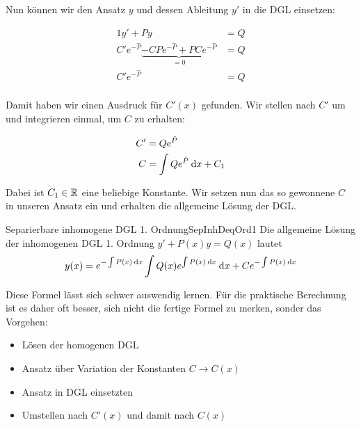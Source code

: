 Nun können wir den Ansatz $y$ und dessen Ableitung $y'$ in die DGL einsetzen:

\begin{alignat*}{1}
    y'+Py                                                 &= Q \\
    C' e^{-\hat{P}} \underbrace{- C P e^{-\hat{P}} + P C e^{-\hat{P}}}_{=0} &= Q \\
    C' e^{-\hat{P}} &= Q \\
\end{alignat*}

Damit haben wir einen Ausdruck für $C'(x)$ gefunden. Wir stellen nach $C'$ um und integrieren einmal, um $C$ zu erhalten:

\begin{alignat*}{1}
    C' &= Q e^{\hat{P}} \\
    C  &= \int Q e^{\hat{P}} \:\mathrm{d}{x} + C_1
\end{alignat*}

Dabei ist $C_1 \in \mathbb{R}$ eine beliebige Konstante. Wir setzen nun das so gewonnene $C$ in unseren Ansatz ein und erhalten die allgemeine Lösung der DGL.

\begin{statement}{Separierbare inhomogene DGL 1. Ordnung}{SepInhDeqOrd1}
    Die allgemeine Lösung der inhomogenen DGL 1. Ordnung $y'+P(x)y=Q(x)$ lautet
    $$
        y(x) =  e^{-\int P(x) \:\mathrm{d}{x}} \int Q(x) e^{\int P(x) \:\mathrm{d}{x}} \:\mathrm{d}{x}   + C e^{-\int P(x) \:\mathrm{d}{x}}
    $$
\end{statement}

Diese Formel lässt sich schwer auswendig lernen. Für die praktische Berechnung ist es daher oft besser, sich nicht die fertige Formel zu merken, sonder das Vorgehen:

\begin{itemize}
    \item Lösen der homogenen DGL
    \item Ansatz über Variation der Konstanten $C \to C(x)$
    \item Ansatz in DGL einsetzten
    \item Umstellen nach $C'(x)$ und damit nach $C(x)$
\end{itemize}

